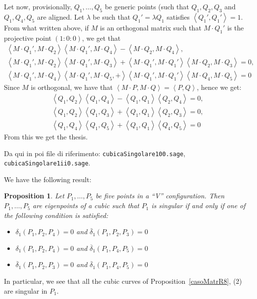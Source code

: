 \documentclass[12pt, a4paper, reqno, captions=tableheading,bibliography=totoc]{scrartcl}
\theoremstyle{plain}
\newtheorem{prop}[lemma]{Proposition}
\theoremstyle{definition}
\newcommand{\scl}[2]{\left\langle {#1}, {#2} \right\rangle}
\begin{document}
Let now, provisionally, $Q_1, \dots, Q_5$ be generic points
(such that $Q_1, Q_2, Q_3$
and $Q_1, Q_4, Q_5$ are aligned. Let $\lambda$ be
such that $Q_1' = \lambda Q_1$ satisfies $\scl{Q_1'}{Q_1'} = 1$.
From what written above, if $M$ is an orthogonal matrix such that
$M \cdot Q_1'$ is the projective point $(1: 0: 0)$, we get that 
\begin{gather*}
\scl{M\cdot Q_1'}{M\cdot Q_2}\scl{M\cdot Q_1'}{M\cdot Q_4}-\scl{M\cdot Q_2}{M\cdot Q_4},\\
\scl{M\cdot Q_1'}{M\cdot Q_2}\scl{M\cdot Q_1'}{M\cdot Q_3}+\scl{M\cdot Q_1'}{M\cdot Q_1'}\scl{M\cdot Q_2}{M\cdot Q_3} = 0, \\
\scl{M\cdot Q_1'}{M\cdot Q_4}\scl{M\cdot Q_1',M\cdot Q_5}+\scl{M\cdot Q_1'}{M\cdot Q_1'}\scl{M\cdot Q_4}{M\cdot Q_5} = 0
\end{gather*}
Since $M$ is orthogonal, we have that $\scl{M\cdot P}{M\cdot Q} = \scl{P}{Q}$,
hence we get:
\begin{gather*}
\scl{Q_1}{Q_2}\scl{Q_1}{Q_4}-\scl{Q_1}{Q_1}\scl{Q_2}{Q_4} = 0, \\
\scl{Q_1}{Q_2}\scl{Q_1}{Q_3}+\scl{Q_1}{Q_1}\scl{Q_2}{Q_3} = 0, \\
\scl{Q_1}{Q_4}\scl{Q_1}{Q_5}+\scl{Q_1}{Q_1}\scl{Q_4}{Q_5} = 0
\end{gather*}
{From} this we get the thesis. 

Da qui in poi file di riferimento:
\verb+cubicaSingolare100.sage+, \verb+cubicaSingolare1ii0.sage+.

We have the following result:

\begin{prop}
  Let $P_1, \dots, P_5$ be five points in a ``V'' configuration. Then
  $P_1, \dots, P_5$ are eigenpoints of a cubic such that $P_1$ is singular
  if and only if one of the following condition is satisfied:
  \begin{itemize}
  \item $\delta_1(P_1, P_2, P_4) = 0 $ and $\overline{\delta}_1(P_1, P_2, P_3)=0$
  \item $\delta_1(P_1, P_2, P_4) = 0 $ and $\overline{\delta}_1(P_1, P_4, P_5)=0$
  \item $\overline{\delta}_1(P_1, P_2, P_3)=0$ and
    $\overline{\delta}_1(P_1, P_4, P_5)=0$
  \end{itemize}
\end{prop}

In particular, we see that all the cubic curves of
Proposition~\ref{casoMatrR8}, (2) are singular in $P_1$.
\end{document}
